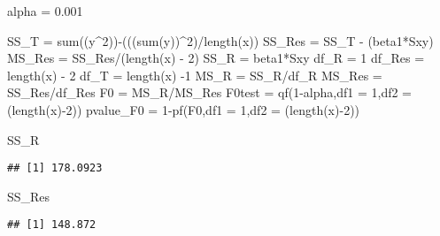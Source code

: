 \documentclass[
]{article}
\newenvironment{Shaded}{\begin{snugshade}}{\end{snugshade}}
\newcommand{\AttributeTok}[1]{\textcolor[rgb]{0.77,0.63,0.00}{#1}}
\newcommand{\DecValTok}[1]{\textcolor[rgb]{0.00,0.00,0.81}{#1}}
\newcommand{\FloatTok}[1]{\textcolor[rgb]{0.00,0.00,0.81}{#1}}
\newcommand{\FunctionTok}[1]{\textcolor[rgb]{0.00,0.00,0.00}{#1}}
\newcommand{\NormalTok}[1]{#1}
\newcommand{\OtherTok}[1]{\textcolor[rgb]{0.56,0.35,0.01}{#1}}
\newcommand{\SpecialCharTok}[1]{\textcolor[rgb]{0.00,0.00,0.00}{#1}}
\begin{document}
\begin{Shaded}
\begin{Highlighting}[]
\NormalTok{alpha }\OtherTok{=} \FloatTok{0.001}

\NormalTok{SS\_T }\OtherTok{=} \FunctionTok{sum}\NormalTok{((y}\SpecialCharTok{\^{}}\DecValTok{2}\NormalTok{))}\SpecialCharTok{{-}}\NormalTok{(((}\FunctionTok{sum}\NormalTok{(y))}\SpecialCharTok{\^{}}\DecValTok{2}\NormalTok{)}\SpecialCharTok{/}\FunctionTok{length}\NormalTok{(x))}
\NormalTok{SS\_Res }\OtherTok{=}\NormalTok{ SS\_T }\SpecialCharTok{{-}}\NormalTok{ (beta1}\SpecialCharTok{*}\NormalTok{Sxy)}
\NormalTok{MS\_Res }\OtherTok{=}\NormalTok{ SS\_Res}\SpecialCharTok{/}\NormalTok{(}\FunctionTok{length}\NormalTok{(x) }\SpecialCharTok{{-}} \DecValTok{2}\NormalTok{)}
\NormalTok{SS\_R }\OtherTok{=}\NormalTok{ beta1}\SpecialCharTok{*}\NormalTok{Sxy}
\NormalTok{df\_R }\OtherTok{=} \DecValTok{1}
\NormalTok{df\_Res }\OtherTok{=} \FunctionTok{length}\NormalTok{(x) }\SpecialCharTok{{-}} \DecValTok{2}
\NormalTok{df\_T }\OtherTok{=} \FunctionTok{length}\NormalTok{(x) }\SpecialCharTok{{-}}\DecValTok{1}
\NormalTok{MS\_R }\OtherTok{=}\NormalTok{ SS\_R}\SpecialCharTok{/}\NormalTok{df\_R}
\NormalTok{MS\_Res }\OtherTok{=}\NormalTok{ SS\_Res}\SpecialCharTok{/}\NormalTok{df\_Res}
\NormalTok{F0 }\OtherTok{=}\NormalTok{ MS\_R}\SpecialCharTok{/}\NormalTok{MS\_Res }
\NormalTok{F0test }\OtherTok{=} \FunctionTok{qf}\NormalTok{(}\DecValTok{1}\SpecialCharTok{{-}}\NormalTok{alpha,}\AttributeTok{df1 =} \DecValTok{1}\NormalTok{,}\AttributeTok{df2 =}\NormalTok{ (}\FunctionTok{length}\NormalTok{(x)}\SpecialCharTok{{-}}\DecValTok{2}\NormalTok{))}
\NormalTok{pvalue\_F0 }\OtherTok{=} \DecValTok{1}\SpecialCharTok{{-}}\FunctionTok{pf}\NormalTok{(F0,}\AttributeTok{df1 =} \DecValTok{1}\NormalTok{,}\AttributeTok{df2 =}\NormalTok{ (}\FunctionTok{length}\NormalTok{(x)}\SpecialCharTok{{-}}\DecValTok{2}\NormalTok{))}

\NormalTok{SS\_R}
\end{Highlighting}
\end{Shaded}

\begin{verbatim}
## [1] 178.0923
\end{verbatim}

\begin{Shaded}
\begin{Highlighting}[]
\NormalTok{SS\_Res}
\end{Highlighting}
\end{Shaded}

\begin{verbatim}
## [1] 148.872
\end{verbatim}
\end{document}
